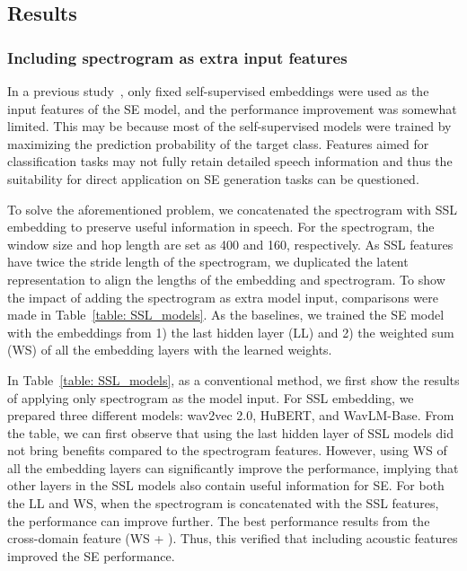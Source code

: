 \documentclass[a4paper]{article}
\begin{document}
\subsection{Results}
\subsubsection{Including spectrogram as extra input features}
In a previous study~\cite{ZiliSSL}, only fixed self-supervised embeddings were used as the input features of the SE model, and the performance improvement was somewhat limited. This may be because most of the self-supervised models were trained by maximizing the prediction probability of the target class. Features aimed for classification tasks may not fully retain detailed speech information and thus the suitability for direct application on SE generation tasks can be questioned.

To solve the aforementioned problem, we concatenated the  spectrogram with SSL embedding to preserve useful information in speech. For the spectrogram, the window size and hop length are set as 400 and 160, respectively. As SSL features have twice the stride length of the spectrogram, we duplicated the latent representation to align the lengths of the embedding and spectrogram. To show the impact of adding the spectrogram as extra model input, comparisons were made in Table~\ref{table: SSL_models}. As the baselines, we trained the SE model with the embeddings from 1) the last hidden layer (LL) and 2) the weighted sum (WS) of all the embedding layers with the learned weights. 

In Table~\ref{table: SSL_models}, as a conventional method, we first show the results of applying only  spectrogram as the model input. For SSL embedding, we prepared three different models: wav2vec 2.0, HuBERT, and WavLM-Base. From the table, we can first observe that using the last hidden layer of SSL models did not bring benefits compared to the spectrogram features. However, using WS of all the embedding layers can significantly improve the performance, implying that other layers in the SSL models also contain useful information for SE. For both the LL and WS, when the  spectrogram is concatenated with the SSL features, the performance can improve further. The best performance results from the cross-domain feature (WS + ). Thus, this verified that including acoustic features improved the SE performance.
\end{document}
